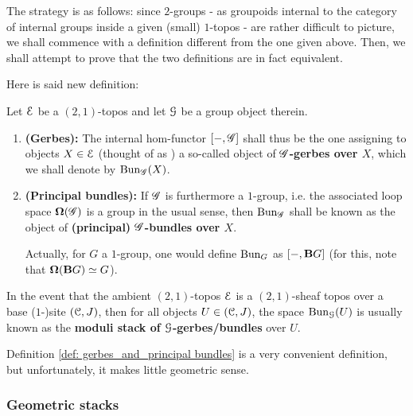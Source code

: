                     The strategy is as follows: since $2$-groups - as groupoids internal to the category of internal groups inside a given (small) $1$-topos - are rather difficult to picture, we shall commence with a definition different from the one given above. Then, we shall attempt to prove that the two definitions are in fact equivalent.
                    
                    Here is said new definition:
                    \begin{definition} \label{def: gerbes_and_principal bundles}
                        Let $\mathcal{E}$ be a $(2, 1)$-topos and let $\mathcal{G}$ be a group object therein. 
                            \begin{enumerate}
                                \item \textbf{(Gerbes):} The internal hom-functor $[-, \mathscr{G}]$ shall thus be the one assigning to objects $X \in \mathcal{E}$ (thought of as ) a so-called object of \textbf{$\mathscr{G}$-gerbes over $X$}, which we shall denote by $\mathrm{Bun}_{\mathscr{G}}(X)$. 
                                \item \textbf{(Principal bundles):} If $\mathscr{G}$ is furthermore a $1$-group, i.e. the associated loop space $\mathbf{\Omega}(\mathscr{G})$ is a group in the usual sense, then $\mathrm{Bun}_{\mathscr{G}}$ shall be known as the object of \textbf{(principal) $\mathscr{G}$-bundles over $X$}.
                                
                                Actually, for $G$ a $1$-group, one would define $\mathrm{Bun}_G$ as $[-, \mathbf{B} G]$ (for this, note that $\mathbf{\Omega}(\mathbf{B} G) \simeq G$).
                            \end{enumerate}
                    \end{definition}
                    \begin{convention}
                        In the event that the ambient $(2, 1)$-topos $\mathcal{E}$ is a $(2, 1)$-sheaf topos over a base ($1$-)site $(\mathcal{C}, J)$, then for all objects $U \in (\mathcal{C}, J)$, the space $\mathrm{Bun}_{\mathcal{G}}(U)$ is usually known as the \textbf{moduli stack of $\mathcal{G}$-gerbes/bundles} over $U$. 
                    \end{convention}
                    
                    Definition \ref{def: gerbes_and_principal bundles} is a very convenient definition, but unfortunately, it makes little geometric sense. 
                 
             \subsubsection{Geometric stacks}   
